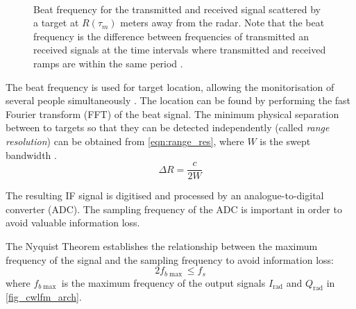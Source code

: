 \begin{figure}[ht]
	\centering
	\\
	\caption[Beat frequency for the transmitted and received signal scattered by a target at $R(\tau_m)$ meters away from the radar. Note that the beat frequency is the difference between frequencies of transmitted an received signals at the time intervals where transmitted and received ramps are within the same period.]{Beat frequency for the transmitted and received signal scattered by a target at $R(\tau_m)$ meters away from the radar. Note that the beat frequency is the difference between frequencies of transmitted an received signals at the time intervals where transmitted and received ramps are within the same period \cite{Sardinero2022}. 		\label{fig_cwlfm_ramps}}
\end{figure}

The beat frequency is used for target location, allowing the monitorisation of several people simultaneously \cite{Antolinos2020}. The location can be found by performing the fast Fourier transform (FFT) of the beat signal. The minimum physical separation between to targets so that they can be detected independently (called \textit{range resolution}) can be obtained from \cref{eqn:range_res}, where $W$ is the swept bandwidth %
\cite{Sardinero2022}.
\begin{equation} \label{eqn:range_res}
	\Delta R = \frac{c}{2W} %
\end{equation}

\label{sec:radar_op}
The resulting IF signal is digitised and processed by an analogue-to-digital converter (ADC). The sampling frequency of the ADC is important in order to avoid valuable information loss.

The Nyquist Theorem \cite{Shannon1949} establishes the relationship between the maximum frequency of the signal and the sampling frequency to avoid information loss:
\begin{equation} \label{eq:nyquist}
	2 f_{b \max} \le f_s
\end{equation}
where $f_{b \max}$ is the maximum frequency of the output signals $I_{\mathrm{rad}}$ and $Q_{\mathrm{rad}}$ in \cref{fig_cwlfm_arch}.

